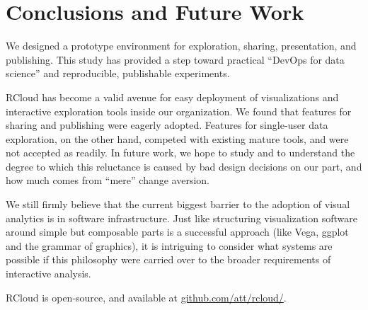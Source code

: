 \section{Conclusions and Future Work}
We designed a prototype environment for exploration, sharing,
presentation, and publishing.  This study has provided a step toward
practical ``DevOps for data science'' and reproducible, publishable
experiments.

RCloud has become a valid avenue for easy deployment of visualizations
and interactive exploration tools inside our organization.  We found
that features for sharing and publishing were eagerly adopted.
Features for single-user data exploration, on the other hand, competed
with existing mature tools, and were not accepted as readily.  In
future work, we hope to study and to understand the degree to which
this reluctance is caused by bad design decisions on our part, and how
much comes from ``mere'' change aversion.

We still firmly believe that the current biggest barrier to the
adoption of visual analytics is in software infrastructure.
Just like structuring visualization software around
simple but composable parts is a successful approach (like Vega, ggplot and the grammar of
graphics), it is intriguing to consider what systems are
possible if this philosophy were carried over to the 
broader requirements of interactive analysis.

RCloud is open-source, and available at \url{github.com/att/rcloud/}.
